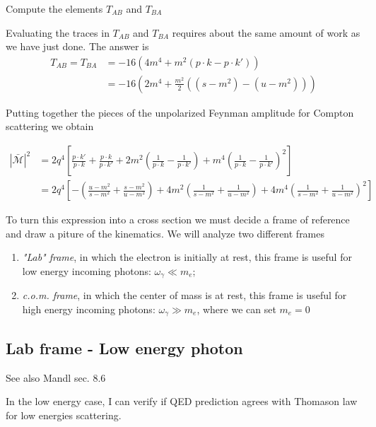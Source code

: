\documentclass[TheoreticalPhy_ModB.tex]{subfiles}
\begin{document}
\begin{exercise}
Compute the elements $T_{AB}$ and $T_{BA}$
\end{exercise}

Evaluating the traces in $T_{AB}$ and $T_{BA}$ requires about the same amount of work as we have just done. The answer is 
\begin{align*}
T_{AB}=T_{BA}&=-16\left(4m^4+m^2(p\cdot k-p\cdot k')\right)\\
&=-16\left(2m^4+\frac{m^2}2((s-m^2)-(u-m^2))\right)
\end{align*}

Putting together the pieces of the unpolarized Feynman amplitude for Compton scattering we obtain

\begin{equation}\label{eqn:Compton-unpolarized-squared}\begin{split}
|\bar{\mathcal M}|^2&=2q^4\left[\frac{p\cdot k'}{p\cdot k}+\frac{p\cdot k}{p\cdot k'}+2m^2\left(\frac1{p\cdot k}-\frac1{p\cdot k'}\right)+m^4\left(\frac1{p\cdot k}-\frac1{p\cdot k'}\right)^2\right]\\
&=2q^4\left[-\left(\frac{u-m^2}{s-m^2}+\frac{s-m^2}{u-m^2}\right)+4m^2\left(\frac1{s-m^2}+\frac1{u-m^2}\right)+4m^4\left(\frac1{s-m^2}+\frac1{u-m^2}\right)^2\right]
\end{split}\end{equation}

To turn this expression into a cross section we must decide a frame of reference and draw a piture of the kinematics. We will analyze two different frames
\begin{enumerate}
\item \emph{"Lab" frame}, in which the electron is initially at rest, this frame is useful for low energy incoming photons: $\omega_\gamma\ll m_e$;
\item \emph{c.o.m. frame}, in which the center of mass is at rest, this frame is useful for high energy incoming photons: $\omega_\gamma\gg m_e$, where we can set $m_e=0$
\end{enumerate}

\subsection{Lab frame - Low energy photon}
\textsf{See also Mandl sec. 8.6}

In the low energy case, I can verify if QED prediction agrees with Thomason law for low energies scattering.

\begin{figure}[H]
\centering

\end{figure}
\end{document}
